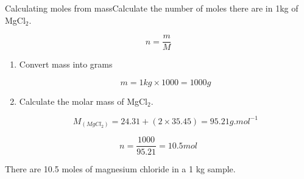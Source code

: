 \begin{wex}{Calculating moles from mass}{Calculate the number of moles there are in 1kg of MgCl$_{2}$.\\}

{

\begin{equation*}
n = \frac{m}{M}
\end{equation*}
}

{

\begin{enumerate}
\item{Convert mass into grams}

\begin{equation*}
m = 1 kg \times 1000 = 1000 g
\end{equation*}

\item{Calculate the molar mass of MgCl$_{2}$.}

\begin{equation*}
M_{(MgCl_{2})} = 24.31 + (2 \times 35.45) = 95.21 g.mol^{-1}
\end{equation*}

\end{enumerate}
}

{

\begin{equation*}
n = \frac{1000}{95.21} = 10.5 mol
\end{equation*}

There are 10.5 moles of magnesium chloride in a 1 kg sample.
}
\end{wex}




